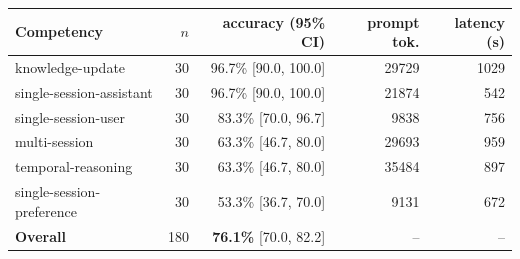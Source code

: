 \begin{tabular}{@{}l r r r r@{}}
\toprule
Competency & $n$ & accuracy (95\% CI) & prompt tok. & latency (s) \\
\midrule
knowledge-update & 30 & 96.7\% [90.0, 100.0] & 29729 & 1029 \\
single-session-assistant & 30 & 96.7\% [90.0, 100.0] & 21874 & 542 \\
single-session-user & 30 & 83.3\% [70.0, 96.7] & 9838 & 756 \\
multi-session & 30 & 63.3\% [46.7, 80.0] & 29693 & 959 \\
temporal-reasoning & 30 & 63.3\% [46.7, 80.0] & 35484 & 897 \\
single-session-preference & 30 & 53.3\% [36.7, 70.0] & 9131 & 672 \\
\midrule
\textbf{Overall} & 180 & \textbf{76.1\%} [70.0, 82.2] & -- & -- \\
\bottomrule
\end{tabular}